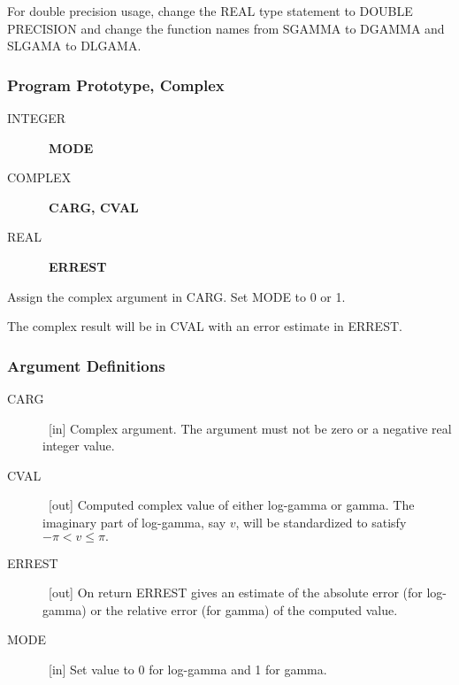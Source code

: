\documentclass[twoside]{MATH77}
\begin{document}
For double precision usage, change the REAL type statement to DOUBLE
PRECISION and change the function names from SGAMMA to DGAMMA and SLGAMA to
DLGAMA.

\subsubsection{Program Prototype, Complex}

\begin{description}
\item[INTEGER]  \ {\bf MODE}

\item[COMPLEX]  \ {\bf CARG, CVAL}

\item[REAL]  \ {\bf ERREST}
\end{description}

Assign the complex argument in CARG. Set MODE to 0 or 1.

\begin{center}
\end{center}

The complex result will be in CVAL with an error estimate in ERREST.

\subsubsection{Argument Definitions}

\begin{description}
\item[CARG]  \ [in] Complex argument. The argument must not be zero or a
negative real integer value.

\item[CVAL]  \ [out] Computed complex value of either log-gamma or gamma.
The imaginary part of log-gamma, say $v$, will be standardized to satisfy $%
-\pi <v\leq \pi .$

\item[ERREST]  \ [out] On return ERREST gives an estimate of the absolute
error (for log-gamma) or the relative error (for gamma) of the computed
value.

\item[MODE]  \ [in] Set value to 0 for log-gamma and 1 for gamma.
\end{description}
\end{document}
